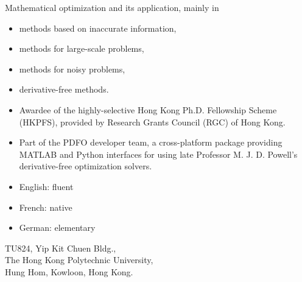 Mathematical optimization and its application, mainly in
\begin{itemize}
    \item methods based on inaccurate information,
    \item methods for large-scale problems,
    \item methods for noisy problems,
    \item derivative-free methods.
\end{itemize}


\cvtag{\LaTeX}


\begin{itemize}
    \item Awardee of the highly-selective Hong Kong Ph.D. Fellowship Scheme (HKPFS), provided by Research Grants Council (RGC) of Hong Kong.
    \item Part of the PDFO developer team, a cross-platform package providing MATLAB and Python interfaces for using late Professor M. J. D. Powell's derivative-free optimization solvers.
\end{itemize}


\begin{itemize}
    \item English: fluent
    \item French: native
    \item German: elementary
\end{itemize}


{TU824, Yip Kit Chuen Bldg., \\The Hong Kong Polytechnic University, \\ Hung Hom, Kowloon, Hong Kong.}

